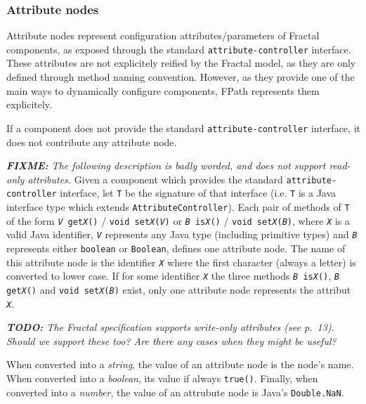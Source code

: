 \documentclass[a4paper,12pt]{report}
\newcommand{\fixme}[1]{\textit{\textbf{FIXME:} #1}}
\newcommand{\todo}[1]{\textit{\textbf{TODO:} #1}}
\newcommand{\interface}[1]{\texttt{#1}}
\newcommand{\type}[1]{\texttt{#1}}
\begin{document}
\subsubsection{Attribute nodes}
\label{sec:attribute-nodes}

Attribute nodes represent configuration attributes/parameters of Fractal components, as
exposed through the standard \interface{attribute-controller} interface. These attributes
are not explicitely reified by the Fractal model, as they are only defined through method
naming convention. However, as they provide one of the main ways to dynamically configure
components, FPath represents them explicitely.

If a component does not provide the standard \interface{attribute-controller} interface,
it does not contribute any attribute node.

\fixme{The following description is badly worded, and does not support read-only
  attributes.} Given a component which provides the standard
\interface{attribute-con\-trol\-ler} interface, let \type{T} be the signature of that
interface (i.e. \type{T} is a Java interface type which extends
\type{AttributeController}). Each pair of methods of \type{T} of the form
\texttt{\textsl{V} get\textsl{X}()} / \texttt{void set\textsl{X}(\textsl{V})} or
\texttt{\textsl{B} is\textsl{X}()} / \texttt{void set\textsl{X}(\textsl{B})}, where
\texttt{\textsl{X}} is a valid Java identifier, \texttt{\textsl{V}} represents any Java
type (including primitive types) and \texttt{\textsl{B}} represents either \type{boolean}
or \type{Boolean}, defines one attribute node. The name of this attribute node is the
identifier \texttt{\textsl{X}} where the first character (always a letter) is converted to
lower case. If for some identifier \texttt{\textsl{X}} the three methods
\texttt{\textsl{B} is\textsl{X}()}, \texttt{\textsl{B} get\textsl{X}()} and \texttt{void
  set\textsl{X}(\textsl{B})} exist, only one attribute node represents the attribut
\texttt{\textsl{X}}.

\todo{The Fractal specification supports write-only attributes (see p.~13). Should we
  support these too? Are there any cases when they might be useful?}

When converted into a \emph{string}, the value of an attribute node is the node's name.
When converted into a \emph{boolean}, its value if always \texttt{true()}. Finally, when
converted into a \emph{number}, the value of an attrubute node is Java's
\texttt{Double.NaN}.
\end{document}
